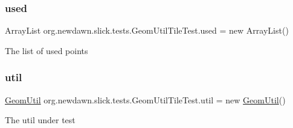 \subsubsection{\texorpdfstring{used}{used}}
{\footnotesize\ttfamily Array\+List org.\+newdawn.\+slick.\+tests.\+Geom\+Util\+Tile\+Test.\+used = new Array\+List()\hspace{0.3cm}{\ttfamily [private]}}

The list of used points \mbox{\label{classorg_1_1newdawn_1_1slick_1_1tests_1_1_geom_util_tile_test_aa29787931045895dd282b7b821145e02}} 
\subsubsection{\texorpdfstring{util}{util}}
{\footnotesize\ttfamily \mbox{\hyperlink{classorg_1_1newdawn_1_1slick_1_1geom_1_1_geom_util}{Geom\+Util}} org.\+newdawn.\+slick.\+tests.\+Geom\+Util\+Tile\+Test.\+util = new \mbox{\hyperlink{classorg_1_1newdawn_1_1slick_1_1geom_1_1_geom_util}{Geom\+Util}}()\hspace{0.3cm}{\ttfamily [private]}}

The util under test 